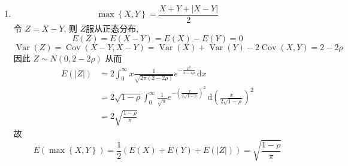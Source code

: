 \documentclass[../main.tex]{subfiles}
\begin{document}
\begin{solution}
    \begin{enumerate}
        \item   \[
        \max \left\{ X,Y \right\}= \frac{X+ Y+ \left| X-Y \right|  }{ 2} 
        \]令 \(  Z= X-Y  \), 则 \(  Z  \)服从正态分布,  \[
        E\left( Z \right)= E\left( X-Y \right)= E\left( X \right)-E\left( Y \right)= 0    
        \] \[
        \operatorname{Var}\left( Z \right)= \operatorname{Cov}\left( X-Y,X-Y \right)= \operatorname{Var}\left( X \right)+ \operatorname{Var}\left( Y \right)- 2 \operatorname{Cov}\left( X,Y \right)= 2-2\rho    
        \]  因此 \(  Z\sim N\left( 0,  2-2\rho  \right)   \) 从而 \[
     \begin{aligned}
        E\left( \left| Z \right|  \right)&= 2 \int_{0}^{\infty} x\frac{1 }{\sqrt{2 \pi \left( 2-2\rho  \right) } }e^{-\frac{x^{2} }{4-4\rho  } }  \,\mathrm{d} x\\ 
         &= 2\sqrt{1-\rho }\int_{0}^{\infty}\frac{1 }{\sqrt{ \pi } }e^{-\left( \frac{x }{2\sqrt{1-\rho } }  \right)^{2} }\,\mathrm{d} \left( \frac{x }{2\sqrt{1-\rho } }   \right)^{2} \\ 
         &= 2 \sqrt{\frac{1-\rho  }{ \pi  } }
     \end{aligned}
        \] 故 \[
        E\left( \max \left\{ X,Y \right\} \right)= \frac{1 }{2 }\left( E\left( X \right)+ E\left( Y \right)+ E\left( \left| Z \right|  \right)    \right)= \sqrt{\frac{1-\rho  }{ \pi  } }   
        \]


\end{enumerate}
\end{solution}
\end{document}
